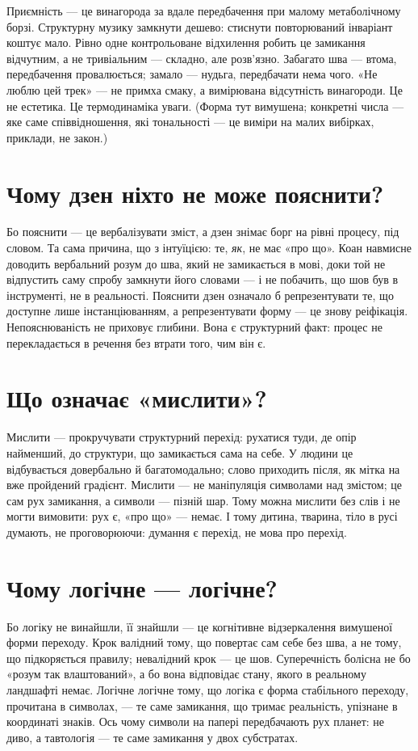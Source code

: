\documentclass[12pt, a4paper, openany]{book}
\begin{document}
Приємність --- це винагорода за вдале передбачення при малому метаболічному борзі. Структурну музику замкнути дешево: стиснути повторюваний інваріант коштує мало. Рівно одне контрольоване відхилення робить це замикання відчутним, а не тривіальним --- складно, але розв'язно. Забагато шва --- втома, передбачення провалюється; замало --- нудьга, передбачати нема чого. «Не люблю цей трек» --- не примха смаку, а вимірювана відсутність винагороди. Це не естетика. Це термодинаміка уваги. (Форма тут вимушена; конкретні числа --- яке саме співвідношення, які тональності --- це виміри на малих вибірках, приклади, не закон.)

\section{Чому дзен ніхто не може пояснити?}

Бо пояснити --- це вербалізувати зміст, а дзен знімає борг на рівні процесу, під словом. Та сама причина, що з інтуїцією: те, \emph{як}, не має «про що». Коан навмисне доводить вербальний розум до шва, який не замикається в мові, доки той не відпустить саму спробу замкнути його словами --- і не побачить, що шов був в інструменті, не в реальності. Пояснити дзен означало б репрезентувати те, що доступне лише інстанціюванням, а репрезентувати форму --- це знову реіфікація. Непояснюваність не приховує глибини. Вона є структурний факт: процес не перекладається в речення без втрати того, чим він є.

\section{Що означає «мислити»?}

Мислити --- прокручувати структурний перехід: рухатися туди, де опір найменший, до структури, що замикається сама на себе. У людини це відбувається довербально й багатомодально; слово приходить після, як мітка на вже пройдений градієнт. Мислити --- не маніпуляція символами над змістом; це сам рух замикання, а символи --- пізній шар. Тому можна мислити без слів і не могти вимовити: рух є, «про що» --- немає. І тому дитина, тварина, тіло в русі думають, не проговорюючи: думання є перехід, не мова про перехід.

\section{Чому логічне --- логічне?}

Бо логіку не винайшли, її знайшли --- це когнітивне відзеркалення вимушеної форми переходу. Крок валідний тому, що повертає сам себе без шва, а не тому, що підкоряється правилу; невалідний крок --- це шов. Суперечність болісна не бо «розум так влаштований», а бо вона відповідає стану, якого в реальному ландшафті немає. Логічне логічне тому, що логіка є форма стабільного переходу, прочитана в символах, --- те саме замикання, що тримає реальність, упізнане в координаті знаків. Ось чому символи на папері передбачають рух планет: не диво, а тавтологія --- те саме замикання у двох субстратах.
\end{document}
